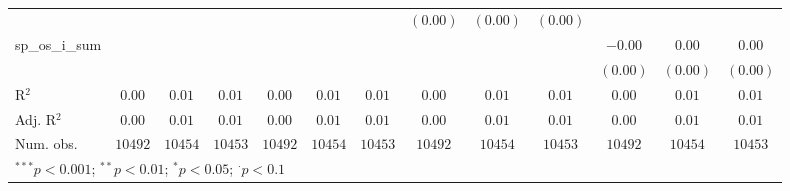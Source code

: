 \begin{sidewaystable}
\begin{center}
{\begin{tabular}{l c c c c c c c c c c c c}
                    &               &                 &                 &               &                 &              & $(0.00)$      & $(0.00)$     & $(0.00)$     &               &              &              \\
sp\_os\_i\_sum      &               &                 &                 &               &                 &              &               &              &              & $-0.00$       & $0.00$       & $0.00$       \\
                    &               &                 &                 &               &                 &              &               &              &              & $(0.00)$      & $(0.00)$     & $(0.00)$     \\
\hline
R$^2$               & $0.00$        & $0.01$          & $0.01$          & $0.00$        & $0.01$          & $0.01$       & $0.00$        & $0.01$       & $0.01$       & $0.00$        & $0.01$       & $0.01$       \\
Adj. R$^2$          & $0.00$        & $0.01$          & $0.01$          & $0.00$        & $0.01$          & $0.01$       & $0.00$        & $0.01$       & $0.01$       & $0.00$        & $0.01$       & $0.01$       \\
Num. obs.           & $10492$       & $10454$         & $10453$         & $10492$       & $10454$         & $10453$      & $10492$       & $10454$      & $10453$      & $10492$       & $10454$      & $10453$      \\
\hline
\multicolumn{13}{l}{\scriptsize{$^{***}p<0.001$; $^{**}p<0.01$; $^{*}p<0.05$; $^{\cdot}p<0.1$}}
\end{tabular}
}
\caption{}
\label{table:coefficients}
\end{center}
\end{sidewaystable}
